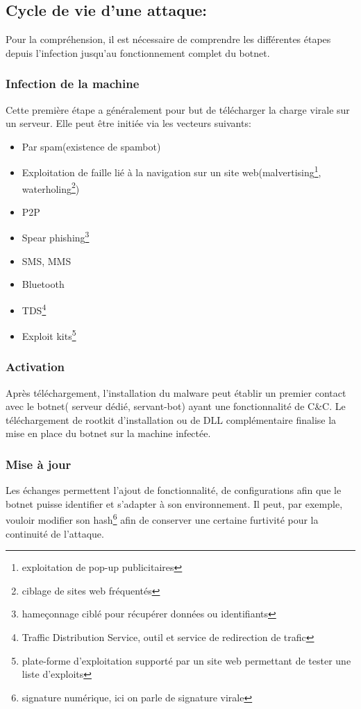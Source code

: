 

\subsection{Cycle de vie d'une attaque:}
\par Pour la compréhension, il est nécessaire de comprendre les différentes étapes depuis l'infection jusqu'au fonctionnement complet du botnet.

\subsubsection{Infection de la machine}
Cette première étape a généralement pour but de télécharger la charge virale sur un serveur.
Elle peut être initiée via les vecteurs suivants:
	 \begin{itemize}
		 \item Par spam(existence de spambot)
		 \item Exploitation de faille lié à la navigation sur un site web(malvertising\footnote{exploitation de pop-up publicitaires}, waterholing\footnote{ciblage de sites web fréquentés})
		 \item P2P
		 \item Spear phishing\footnote{hameçonnage ciblé pour récupérer données ou identifiants}
		 \item SMS, MMS
		 \item Bluetooth
		 \item TDS\footnote{Traffic Distribution Service, outil et service de redirection de trafic}
		 \item Exploit kits\footnote{plate-forme d'exploitation supporté par un site web permettant de tester une liste d'exploits}
	 \end{itemize}
	
\subsubsection{Activation}
Après téléchargement, l'installation du malware peut établir un premier contact avec le botnet( serveur dédié, servant-bot) ayant une fonctionnalité de C\&C.
Le téléchargement de rootkit d'installation ou de DLL complémentaire finalise la mise en place du botnet sur la machine infectée.	
	
\subsubsection{Mise à jour}
Les échanges permettent l'ajout de fonctionnalité, de configurations afin que le botnet puisse identifier et s'adapter à son environnement.
Il peut, par exemple, vouloir modifier son hash\footnote{signature numérique, ici on parle de signature virale} afin de conserver une certaine furtivité pour la continuité de l'attaque.

